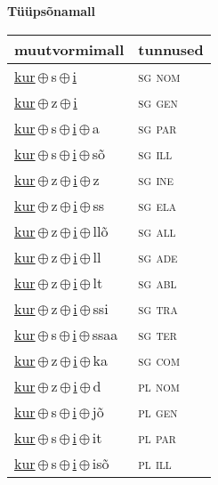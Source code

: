 

\vspace{3.5em}
\noindent \begin{minipage}{\textwidth}
\noindent \textbf{Tüüpsõnamall \,}\\

\begin{sideways}
\begin{tabular}{l l}
muutvormimall & tunnused \\
\hline
\underline{kur}\,$\oplus$\,s\,$\oplus$\,\underline{i} & \textsc{ sg nom } \\
\underline{kur}\,$\oplus$\,z\,$\oplus$\,\underline{i} & \textsc{ sg gen } \\
\underline{kur}\,$\oplus$\,s\,$\oplus$\,\underline{i}\,$\oplus$\,a & \textsc{ sg par } \\
\underline{kur}\,$\oplus$\,s\,$\oplus$\,\underline{i}\,$\oplus$\,sõ & \textsc{ sg ill } \\
\underline{kur}\,$\oplus$\,z\,$\oplus$\,\underline{i}\,$\oplus$\,z & \textsc{ sg ine } \\
\underline{kur}\,$\oplus$\,z\,$\oplus$\,\underline{i}\,$\oplus$\,ss & \textsc{ sg ela } \\
\underline{kur}\,$\oplus$\,z\,$\oplus$\,\underline{i}\,$\oplus$\,llõ & \textsc{ sg all } \\
\underline{kur}\,$\oplus$\,z\,$\oplus$\,\underline{i}\,$\oplus$\,ll & \textsc{ sg ade } \\
\underline{kur}\,$\oplus$\,z\,$\oplus$\,\underline{i}\,$\oplus$\,lt & \textsc{ sg abl } \\
\underline{kur}\,$\oplus$\,z\,$\oplus$\,\underline{i}\,$\oplus$\,ssi & \textsc{ sg tra } \\
\underline{kur}\,$\oplus$\,s\,$\oplus$\,\underline{i}\,$\oplus$\,ssaa & \textsc{ sg ter } \\
\underline{kur}\,$\oplus$\,z\,$\oplus$\,\underline{i}\,$\oplus$\,ka & \textsc{ sg com } \\
\underline{kur}\,$\oplus$\,z\,$\oplus$\,\underline{i}\,$\oplus$\,d & \textsc{ pl nom } \\
\underline{kur}\,$\oplus$\,s\,$\oplus$\,\underline{i}\,$\oplus$\,jõ & \textsc{ pl gen } \\
\underline{kur}\,$\oplus$\,s\,$\oplus$\,\underline{i}\,$\oplus$\,it & \textsc{ pl par } \\
\underline{kur}\,$\oplus$\,s\,$\oplus$\,\underline{i}\,$\oplus$\,isõ & \textsc{ pl ill } \\

\end{tabular}
\end{sideways}
\end{minipage}
